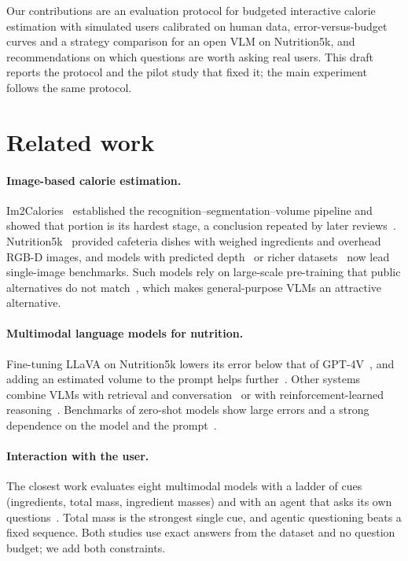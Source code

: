 \documentclass[twocolumn]{svjour3}
\begin{document}
Our contributions are an evaluation protocol for budgeted interactive calorie estimation with simulated
users calibrated on human data, error-versus-budget curves and a strategy comparison for an open VLM on
Nutrition5k, and recommendations on which questions are worth asking real users. This draft reports the
protocol and the pilot study that fixed it; the main experiment follows the same protocol.

\section{Related work}
\label{sec:related}

\paragraph{Image-based calorie estimation.}
Im2Calories~\cite{meyers2015im2calories} established the recognition--segmentation--volume pipeline and
showed that portion is its hardest stage, a conclusion repeated by later reviews~\cite{lo2020review,vinod2026portion}.
Nutrition5k~\cite{thames2021nutrition5k} provided cafeteria dishes with weighed ingredients and overhead
RGB-D images, and models with predicted depth~\cite{han2023dpf} or richer datasets~\cite{yu2026omnifood8k}
now lead single-image benchmarks. Such models rely on large-scale pre-training that public alternatives do
not match~\cite{andrade2025pretraining}, which makes general-purpose VLMs an attractive alternative.

\paragraph{Multimodal language models for nutrition.}
Fine-tuning LLaVA on Nutrition5k lowers its error below that of GPT-4V~\cite{tanabe2024calorielava}, and
adding an estimated volume to the prompt helps further~\cite{tanabe2025calorievol}. Other systems combine
VLMs with retrieval and conversation~\cite{yao2024caloraify} or with reinforcement-learned
reasoning~\cite{zhu2026foodr1}. Benchmarks of zero-shot models show large errors and a strong dependence on
the model and the prompt~\cite{fridolfsson2025llm,coburn2025lmm,nutrients2026prompt}.

\paragraph{Interaction with the user.}
The closest work evaluates eight multimodal models with a ladder of cues (ingredients, total mass,
ingredient masses) and with an agent that asks its own questions~\cite{bhatambarekar2025thesis,bhatambarekar2026agentic}.
Total mass is the strongest single cue, and agentic questioning beats a fixed sequence. Both studies use
exact answers from the dataset and no question budget; we add both constraints.
\end{document}
